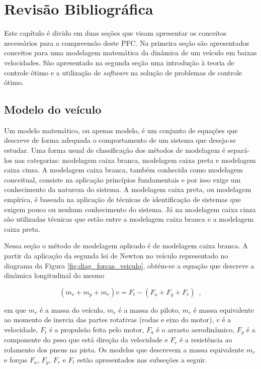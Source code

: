 \chapter[Revisão Bibliográfica]{Revisão Bibliográfica}
\label{chap:revisao}
\thispagestyle{empty}

Este capítulo é divido em duas seções que visam apresentar os conceitos necessários para a compreensão deste PFC.
Na primeira seção são apresentados conceitos para uma modelagem matemática da dinâmica de um veículo em baixas velocidades.
São apresentado na segunda seção uma introdução à teoria de controle ótimo e a utilização de \textit{software} na solução
de problemas de controle ótimo.

\section{Modelo do veículo}
\label{sec:modelo}

Um modelo matemático, ou apenas modelo, é um conjunto de equações que descreve de forma adequada o comportamento de um sistema que deseja-se estudar.
Uma forma usual de classificação dos métodos de modelagem é separá-los nas categorias: modelagem caixa branca, modelagem caixa preta e modelagem
caixa cinza.
A modelagem caixa branca, também conhecida como modelagem conceitual, consiste na aplicação princípios fundamentais e por isso exige um conhecimento
da natureza do sistema.
A modelagem caixa preta, ou modelagem empírica, é baseada na aplicação de técnicas de identificação de sistemas que exigem pouco ou
nenhum conhecimento do sistema.
Já na modelagem caixa cinza são utilizadas técnicas que estão entre a modelagem caixa branca e a modelagem caixa preta. \cite[Seç.~1.1]{book:Aguirre}

Nessa seção o método de modelagem aplicado é de modelagem caixa branca. A partir da aplicação da segunda lei de Newton no
veículo representado no diagrama da Figura \ref{fig:diag_forcas_veiculo}, obtém-se a equação que descreve a dinâmica longitudinal do mesmo

\begin{equation}
	\label{eq:SomaForcas}
	(m_v + m_p + m_r) \dot v = F_t - (F_a + F_g + F_r)
	\enspace,
\end{equation}

em que $m_v$ é a massa do veículo, $m_v$ é a massa do piloto,  $m_r$ é massa equivalente ao momento de inercia das partes rotativas (rodas e eixo do motor),  $v$ é a velocidade, $F_{t}$ é a propulsão feita pelo motor, $F_{a}$ é o
arrasto aerodinâmico, $F_g$ é a componente do peso que está direção da velocidade e $F_{r}$ é a resistência ao rolamento dos pneus na pista.
Os modelos que descrevem a massa equivalente $m_r$ e forças $F_{a}$, $F_g$, $F_{r}$ e $F_{t}$ estão apresentados nas subseções a seguir.

